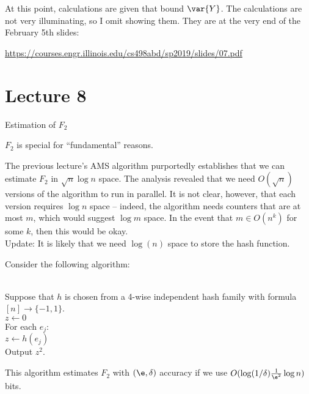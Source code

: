 \documentclass[../main.tex]{subfiles}
\begin{document}
\begin{remark}
    At this point, calculations are given that bound $\var{Y}$. The calculations are not very illuminating, so I omit showing them. They are at the very end of the February 5th slides:

    \url{https://courses.engr.illinois.edu/cs498abd/sp2019/slides/07.pdf}

\end{remark}

\section{Lecture 8}{Estimation of $F_2$}

\begin{remark}
    $F_2$ is special for ``fundamental'' reasons.
\end{remark}

\begin{unresolved}
    The previous lecture's AMS algorithm purportedly establishes that we can estimate $F_2$ in $\sqrt{n} \log n$ space. The analysis revealed that we need $O(\sqrt{n})$ versions of the algorithm to run in parallel. It is not clear, however, that each version requires $\log n$ space -- indeed, the algorithm needs counters that are at most $m$, which would suggest $\log m$ space. In the event that $m \in O(n^k)$ for some $k$, then this would be okay.\\

   Update: It is likely that we need $\log(n)$ space to store the hash function.
\end{unresolved}

\begin{lemma}
    Consider the following algorithm:
    \begin{algo}
         \+\\
        Suppose that $h$ is chosen from a 4-wise independent hash family with formula $[n] \to \{-1,1\}$. \\
        $z \leftarrow 0$ \\
        For each $e_j$: \+\\
            $z \leftarrow h(e_j)$ \-\\
        Output $z^2$.
    \end{algo}

    This algorithm estimates $F_2$ with $(\e, \delta)$ accuracy if we use $O(\log (1/\delta) \frac{1}{\e^2} \log n)$ bits. 
\end{lemma}
\end{document}
